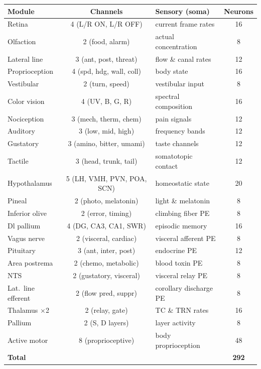 \documentclass[11pt,a4paper]{article}
\begin{document}
\begin{center}\small
\begin{tabular}{lclc}
\toprule
Module & Channels & Sensory (soma) & Neurons \\
\midrule
Retina      & 4 (L/R ON, L/R OFF) & current frame rates   & 16 \\
Olfaction   & 2 (food, alarm)     & actual concentration  & 8  \\
Lateral line& 3 (ant, post, threat)& flow \& canal rates  & 12 \\
Proprioception& 4 (spd, hdg, wall, coll) & body state     & 16 \\
Vestibular  & 2 (turn, speed)     & vestibular input      & 8  \\
Color vision& 4 (UV, B, G, R)     & spectral composition  & 16 \\
Nociception & 3 (mech, therm, chem) & pain signals        & 12 \\
Auditory    & 3 (low, mid, high)  & frequency bands       & 12 \\
Gustatory   & 3 (amino, bitter, umami) & taste channels   & 12 \\
Tactile     & 3 (head, trunk, tail) & somatotopic contact & 12 \\
Hypothalamus& 5 (LH, VMH, PVN, POA, SCN) & homeostatic state & 20 \\
Pineal      & 2 (photo, melatonin)  & light \& melatonin  & 8  \\
Inferior olive& 2 (error, timing)   & climbing fiber PE   & 8  \\
Dl pallium    & 4 (DG, CA3, CA1, SWR) & episodic memory   & 16 \\
Vagus nerve & 2 (visceral, cardiac) & visceral afferent PE & 8 \\
Pituitary   & 3 (ant, inter, post)  & endocrine PE       & 12 \\
Area postrema & 2 (chemo, metabolic) & blood toxin PE     & 8 \\
NTS         & 2 (gustatory, visceral) & visceral relay PE  & 8 \\
Lat.\ line efferent & 2 (flow pred, suppr) & corollary discharge PE & 8 \\
Thalamus $\times$2& 2 (relay, gate) & TC \& TRN rates     & 16 \\
Pallium     & 2 (S, D layers)     & layer activity        & 8  \\
Active motor& 8 (proprioceptive)  & body proprioception   & 48 \\
\midrule
\textbf{Total} & & & \textbf{292} \\
\bottomrule
\end{tabular}
\end{center}
\end{document}
